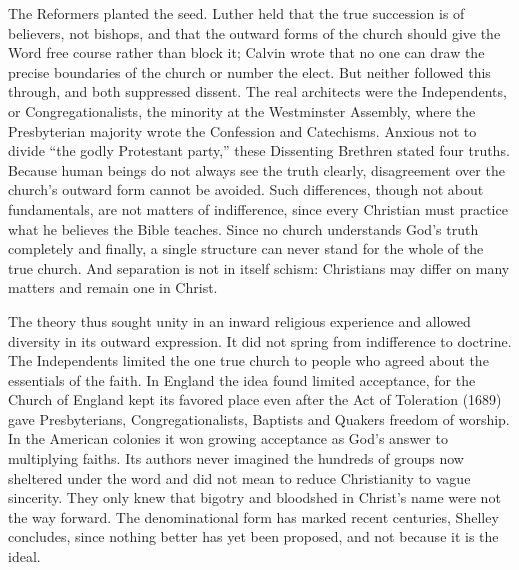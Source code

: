 The Reformers planted the seed. Luther held that the true succession is of believers, not bishops,
and that the outward forms of the church should give the Word free course rather than block it;
Calvin wrote that no one can draw the precise boundaries of the church or number the elect. But
neither followed this through, and both suppressed dissent. The real architects were the
Independents, or Congregationalists, the minority at the Westminster Assembly, where the Presbyterian
majority wrote the Confession and Catechisms. Anxious not to divide ``the godly Protestant party,''
these Dissenting Brethren stated four truths. Because human beings do not always see the truth
clearly, disagreement over the church's outward form cannot be avoided. Such differences, though
not about fundamentals, are not matters of indifference, since every Christian must practice what he
believes the Bible teaches. Since no church understands God's truth completely and finally, a single structure can never stand for the whole of the true church. And separation is not in itself schism:
Christians may differ on many matters and remain one in Christ.

The theory thus sought unity in an inward religious experience and allowed diversity in its outward
expression. It did not spring from indifference to doctrine. The Independents limited the one true church to people who agreed about the essentials of the faith. In England the idea
found limited acceptance, for the Church of England kept its favored place even after the Act of
Toleration (1689) gave Presbyterians, Congregationalists, Baptists and Quakers freedom of worship. In
the American colonies it won growing acceptance as God's answer to multiplying faiths. Its authors
never imagined the hundreds of groups now sheltered under the word and did not mean to reduce
Christianity to vague sincerity. They only knew that bigotry and bloodshed in Christ's name were not
the way forward. The denominational form has marked recent centuries, Shelley concludes, since nothing better has yet been proposed, and not because it is the ideal.

\begin{keyfacts}
\end{keyfacts}
